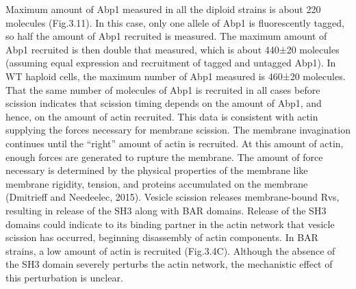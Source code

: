 \documentclass[9pt,lineno]{elife}
\begin{document}
Maximum amount of Abp1 measured in all the diploid strains is about 220 molecules (Fig.3.11). In this case, only one allele of Abp1 is fluorescently tagged, so half the amount of Abp1 recruited is measured. The maximum amount of Abp1 recruited is then double that measured, which is about 440±20 molecules (assuming equal expression and recruitment of tagged and untagged Abp1). In WT haploid cells, the maximum number of Abp1 measured is 460±20 molecules. That the same number of molecules of Abp1 is recruited in all cases before scission indicates that scission timing depends on the amount of Abp1, and hence, on the amount of actin recruited.
This data is consistent with actin supplying the forces necessary for membrane scission. The membrane invagination continues until the “right” amount of actin is recruited. At this amount of actin, enough forces are generated to rupture the membrane. The amount of force necessary is determined by the physical properties of the membrane like membrane rigidity, tension, and proteins accumulated on the membrane (Dmitrieff and Needeelec, 2015). Vesicle scission releases membrane-bound Rvs, resulting in release of the SH3 along with BAR domains. Release of the SH3 domains could indicate to its binding partner in the actin network that vesicle scission has occurred, beginning disassembly of actin components. In BAR strains, a low amount of actin is recruited (Fig.3.4C). Although the absence of the SH3 domain severely perturbs the actin network, the mechanistic effect of this perturbation is unclear.
\end{document}
